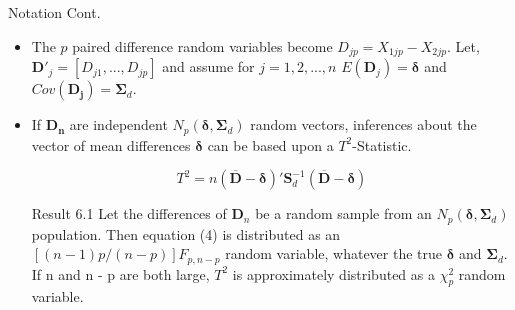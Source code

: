 \documentclass[8pt]{beamer}
\begin{document}
    \begin{frame}{Notation Cont.}
    \begin{itemize}
        \item The $p$ paired difference random variables become $D_{jp} = X_{1jp} - X_{2jp}$. Let, $\mathbf{D}'_{j} = [D_{j1},...,D_{jp}]$ and assume for $j = 1,2,...,n$ $E(\mathbf{D}_{j}) = \mathbf{\delta}$ and $Cov(\mathbf{D_{j}}) = \mathbf{\Sigma}_{d}$.
        
        \item If $\mathbf{D_{n}}$ are independent $N_{p}(\mathbf{\delta}, \mathbf{\Sigma}_{d})$ random vectors, inferences about the vector of mean differences $\mathbf{\delta}$ can be based upon a $T^{2}$-Statistic.  
        
        \begin{equation}
            T^{2} = n(\mathbf{\overline{D} - \mathbf{\delta}})'\mathbf{S}_{d}^{-1}(\overline{\mathbf{D}} - \mathbf{\delta})
        \end{equation}
        
        \begin{block}{Result 6.1}
            Let the differences of $\mathbf{D}_{n}$ be a random sample from an $N_{p}(\mathbf{\delta}, \mathbf{\Sigma}_{d})$ population. Then equation (4) is distributed as an $[(n-1)p/(n-p)]F_{p,n-p}$ random variable, whatever the true $\mathbf{\delta}$ and $\mathbf{\Sigma}_{d}$. If n and n - p are both large, $T^{2}$ is approximately distributed as a $\chi^{2}_{p}$ random variable. 
        \end{block}
        
    \end{itemize}
    \end{frame}
\end{document}
